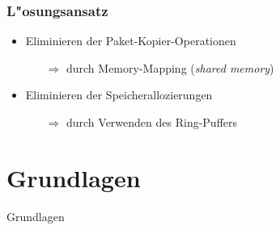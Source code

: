 \documentclass{beamer}
\begin{document}
\begin{frame}
\frametitle{L"osungsansatz}
\begin{itemize}
	\item Eliminieren der Paket-Kopier-Operationen
		\begin{itemize}
			\item [$\Rightarrow$] durch Memory-Mapping (\emph{shared memory})\newline
		\end{itemize}
	\item Eliminieren der Speicherallozierungen
		\begin{itemize}
			\item [$\Rightarrow$] durch Verwenden des Ring-Puffers
		\end{itemize}
\end{itemize}
\end{frame}

\section{Grundlagen}
\begin{frame}
	\begin{center}
	\huge{Grundlagen}
	\end{center}
\end{frame}
\end{document}
